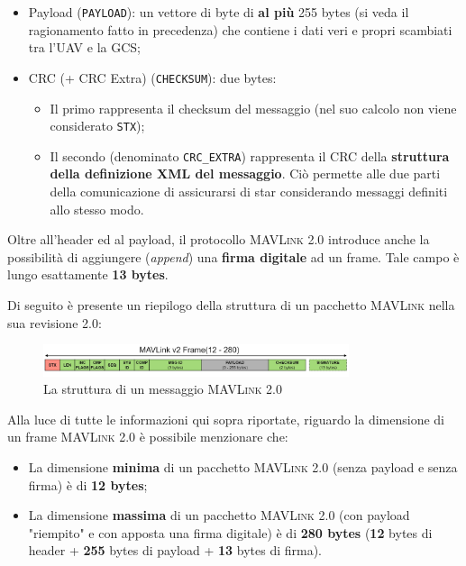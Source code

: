 \documentclass[a4paper, 12pt, oneside]{article}
\theoremstyle{definition}
\begin{document}
\begin{itemize}
    \item Payload (\texttt{PAYLOAD}): un vettore di byte di \textbf{al più} 255 bytes (si veda il ragionamento fatto in precedenza) che contiene i dati veri e propri scambiati tra l'UAV e la GCS;
    \item CRC (+ CRC Extra) (\texttt{CHECKSUM}): due bytes: \begin{itemize}
        \item Il primo rappresenta il checksum del messaggio (nel suo calcolo non viene considerato \texttt{STX});
        \item Il secondo (denominato \texttt{CRC\_EXTRA}) rappresenta il CRC della \textbf{struttura della definizione XML del messaggio}. Ciò permette alle due parti della comunicazione di assicurarsi di star considerando messaggi definiti allo stesso modo.
    \end{itemize}
\end{itemize}

Oltre all'header ed al payload, il protocollo \textsc{MAVLink} 2.0 introduce anche la possibilità di aggiungere (\textit{append}) una \textbf{firma digitale} ad un frame. Tale campo è lungo esattamente \textbf{13 bytes}.

\newpage

Di seguito è presente un riepilogo della struttura di un pacchetto \textsc{MAVLink} nella sua revisione 2.0:

\begin{figure}[H]
    \centering
    \includegraphics[width=0.8\textwidth]{images/packet_mavlink_v2.jpg}
    \caption{La struttura di un messaggio \textsc{MAVLink} 2.0}
\end{figure}

Alla luce di tutte le informazioni qui sopra riportate, riguardo la dimensione di un frame \textsc{MAVLink} 2.0 è possibile menzionare che:

\begin{itemize}
    \item La dimensione \textbf{minima} di un pacchetto \textsc{MAVLink} 2.0 (senza payload e senza firma) è di \textbf{12 bytes};
    \item La dimensione \textbf{massima} di un pacchetto \textsc{MAVLink} 2.0 (con payload "riempito" e con apposta una firma digitale) è di \textbf{280 bytes} (\textbf{12} bytes di header + \textbf{255} bytes di payload + \textbf{13} bytes di firma). 
\end{itemize}
\end{document}
